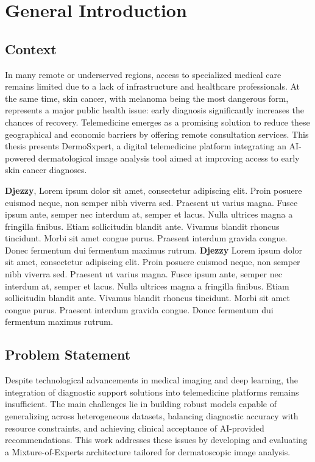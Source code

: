 \chapter*{General Introduction}
\label{chap:introduction}

\section*{Context}

In many remote or underserved regions, access to specialized medical care remains limited due to a lack of infrastructure and healthcare professionals. At the same time, skin cancer, with melanoma being the most dangerous form, represents a major public health issue: early diagnosis significantly increases the chances of recovery. Telemedicine emerges as a promising solution to reduce these geographical and economic barriers by offering remote consultation services. This thesis presents DermoSxpert, a digital telemedicine platform integrating an AI-powered dermatological image analysis tool aimed at improving access to early skin cancer diagnoses.

\medskip

\textbf{Djezzy}, Lorem ipsum dolor sit amet, consectetur adipiscing elit. Proin posuere euismod neque, non semper nibh viverra sed. Praesent ut varius magna. Fusce ipsum ante, semper nec interdum at, semper et lacus. Nulla ultrices magna a fringilla finibus. Etiam sollicitudin blandit ante. Vivamus blandit rhoncus tincidunt. Morbi sit amet congue purus. Praesent interdum gravida congue. Donec fermentum dui fermentum maximus rutrum. \textbf{Djezzy} Lorem ipsum dolor sit amet, consectetur adipiscing elit. Proin posuere euismod neque, non semper nibh viverra sed. Praesent ut varius magna. Fusce ipsum ante, semper nec interdum at, semper et lacus. Nulla ultrices magna a fringilla finibus. Etiam sollicitudin blandit ante. Vivamus blandit rhoncus tincidunt. Morbi sit amet congue purus. Praesent interdum gravida congue. Donec fermentum dui fermentum maximus rutrum.

\medskip

\section*{Problem Statement}

Despite technological advancements in medical imaging and deep learning, the integration of diagnostic support solutions into telemedicine platforms remains insufficient. The main challenges lie in building robust models capable of generalizing across heterogeneous datasets, balancing diagnostic accuracy with resource constraints, and achieving clinical acceptance of AI-provided recommendations. This work addresses these issues by developing and evaluating a Mixture-of-Experts architecture tailored for dermatoscopic image analysis.

